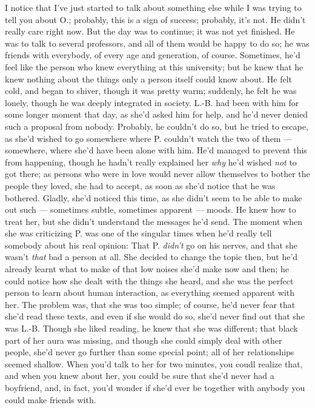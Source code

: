 I notice that I've just started to talk about something else while I was trying to tell you about O.; probably, this is a sign of success; probably, it's not. He didn't really care right now. 
But the day was to continue; it was not yet finished. He was to talk to several professors, and all of them would be happy to do so; he was friends with everybody, of every age and generation, of course. Sometimes, he'd feel like the person who knew everything at this university; but he knew that he knew nothing about the things only a person itself could know about. 
He felt cold, and began to shiver, though it was pretty warm; suddenly, he felt he was lonely, though he was deeply integrated in society. 
L.-B. had been with him for some longer moment that day, as she'd asked him for help, and he'd never denied such a proposal from nobody. Probably, he couldn't do so, but he tried to escape, as she'd wished to go somewhere where P. couldn't watch the two of them --- somewhere, where she'd have been alone with him. He'd managed to prevent this from happening, though he hadn't really explained her \emph{why} he'd wished \emph{not} to got there; as persons who were in love would never allow themselves to bother the people they loved, she had to accept, as soon as she'd notice that he was bothered. Gladly, she'd noticed this time, as she didn't seem to be able to make out such --- sometimes subtle, sometimes apparent --- moods. 
He knew how to treat her, but she didn't understand the messages he'd send. The moment when she was criticizing P. was one of the singular times when he'd really tell somebody about his real opinion: That P. \emph{didn't} go on his nerves, and that she wasn't \emph{that} bad a person at all. She decided to change the topic then, but he'd already learnt what to make of that low noises she'd make now and then; he could notice how she dealt with the things she heard, and she was the perfect person to learn about human interaction, as everything seemed apparent with her. The problem was, that she was too simple; of course, he'd never fear that she'd read these texts, and even if she would do so, she'd never find out that she was L.-B. Though she liked reading, he knew that she was different; that black part of her aura was missing, and though she could simply deal with other people, she'd never go further than some special point; all of her relationships seemed shallow. When you'd talk to her for two minutes, you coudl realize that, and when you knew about her, you could be sure that she'd never had a boyfriend, and, in fact, you'd wonder if she'd ever be together with anybody you could make friends with. 
